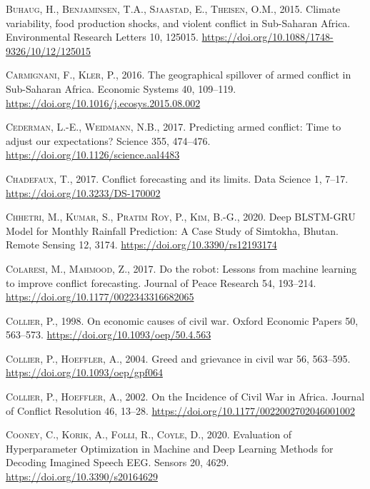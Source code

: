 \documentclass[a4paper,11pt]{article}
\begin{document}
\leavevmode\hypertarget{ref-buhaug2015}{}%
\textsc{Buhaug, H., Benjaminsen, T.A., Sjaastad, E., Theisen, O.M.}, 2015. Climate variability, food production shocks, and violent conflict in Sub-Saharan Africa. Environmental Research Letters 10, 125015. \url{https://doi.org/10.1088/1748-9326/10/12/125015}

\leavevmode\hypertarget{ref-carmignani2016}{}%
\textsc{Carmignani, F., Kler, P.}, 2016. The geographical spillover of armed conflict in Sub-Saharan Africa. Economic Systems 40, 109--119. \url{https://doi.org/10.1016/j.ecosys.2015.08.002}

\leavevmode\hypertarget{ref-cederman2017}{}%
\textsc{Cederman, L.-E., Weidmann, N.B.}, 2017. Predicting armed conflict: Time to adjust our expectations? Science 355, 474--476. \url{https://doi.org/10.1126/science.aal4483}

\leavevmode\hypertarget{ref-chadefaux2017}{}%
\textsc{Chadefaux, T.}, 2017. Conflict forecasting and its limits. Data Science 1, 7--17. \url{https://doi.org/10.3233/DS-170002}

\leavevmode\hypertarget{ref-chhetri2020}{}%
\textsc{Chhetri, M., Kumar, S., Pratim Roy, P., Kim, B.-G.}, 2020. Deep BLSTM-GRU Model for Monthly Rainfall Prediction: A Case Study of Simtokha, Bhutan. Remote Sensing 12, 3174. \url{https://doi.org/10.3390/rs12193174}

\leavevmode\hypertarget{ref-colaresi2017}{}%
\textsc{Colaresi, M., Mahmood, Z.}, 2017. Do the robot: Lessons from machine learning to improve conflict forecasting. Journal of Peace Research 54, 193--214. \url{https://doi.org/10.1177/0022343316682065}

\leavevmode\hypertarget{ref-collier1998}{}%
\textsc{Collier, P.}, 1998. On economic causes of civil war. Oxford Economic Papers 50, 563--573. \url{https://doi.org/10.1093/oep/50.4.563}

\leavevmode\hypertarget{ref-collier2004}{}%
\textsc{Collier, P., Hoeffler, A.}, 2004. Greed and grievance in civil war 56, 563--595. \url{https://doi.org/10.1093/oep/gpf064}

\leavevmode\hypertarget{ref-collier2002}{}%
\textsc{Collier, P., Hoeffler, A.}, 2002. On the Incidence of Civil War in Africa. Journal of Conflict Resolution 46, 13--28. \url{https://doi.org/10.1177/0022002702046001002}

\leavevmode\hypertarget{ref-cooney2020}{}%
\textsc{Cooney, C., Korik, A., Folli, R., Coyle, D.}, 2020. Evaluation of Hyperparameter Optimization in Machine and Deep Learning Methods for Decoding Imagined Speech EEG. Sensors 20, 4629. \url{https://doi.org/10.3390/s20164629}
\end{document}
